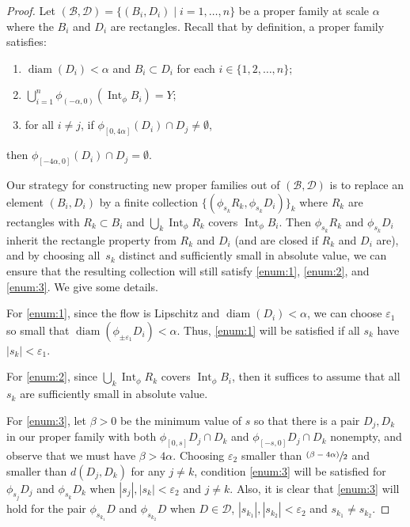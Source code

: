 \documentclass[11pt]{article}
\let\mathcal\mathscr
\let\epsilon\varepsilon
\let\sep\mid
\newcommand{\psfrac}[2]{\sfrac{(#1)}{#2}}
\theoremstyle{definition}
\numberwithin{equation}{section}
\DeclareMathOperator{\diam}{diam}
\DeclareMathOperator{\Int}{Int}
\newcommand\DDD{\mathcal D}
\newcommand\BBB{\mathcal B}
\begin{document}
\begin{proof}
Let $(\mathcal{B},\mathcal{D})= \{(B_i, D_i) \sep i = 1, \ldots, n \}$ be a proper family at scale $\alpha$ where the $B_i$ and $D_i$ are rectangles. Recall that by definition, a proper family satisfies:
\begin{enumerate}
\item\label{enum:1}
$\diam (D_i)< \alpha$ and $B_i \subset D_i$ for each $i \in \{1, 2, \ldots, n\}$;
\item\label{enum:2}
$\bigcup_{i=1}^n\phi_{(-\alpha, 0)} (\Int_\phi B_i)=Y$;
\item\label{enum:3}
for all $i\neq j$, if $\phi_{[0, 4\alpha]}(D_i) \cap D_j \neq \emptyset$, 
\end{enumerate}
then $\phi_{[-4\alpha, 0]}(D_i) \cap D_j = \emptyset$.

Our strategy for constructing new proper families out of $(\BBB, \DDD)$ is to replace an element $(B_i, D_i)$ by a finite collection $\{ (\phi_{s_k}R_k, \phi_{s_k}D_i) \}_k$ where $R_k$ are rectangles with $R_k \subset B_i$ and $\bigcup_k \Int_\phi R_k$ covers $\Int_\phi B_i$. Then $\phi_{s_k}R_k$ and $\phi_{s_k}D_i$ inherit the rectangle property from $R_k$ and $D_i$ (and are closed if $R_k$ and $D_i$ are), and by choosing all~$s_k$ distinct and sufficiently small in absolute value, we can ensure that the resulting collection will still satisfy \eqref{enum:1}, \eqref{enum:2}, and \eqref{enum:3}. We give some details.

For \eqref{enum:1}, since the flow is Lipschitz and $\diam(D_{i})<\alpha$, we can choose $\epsilon_1$ so small that $\diam(\phi_{\pm\epsilon_1}D_{i})<\alpha$. Thus, \eqref{enum:1} will be satisfied if all $s_k$ have $|s_k| < \epsilon_1$.

For \eqref{enum:2}, since $\bigcup_k \Int_\phi R_k$ covers $\Int_\phi B_i$, then it suffices to assume that all $s_k$ are sufficiently small in absolute value.

For \eqref{enum:3}, let $\beta>0$ be the minimum value of $s$ so that there is a pair $D_j, D_k$ in our proper family with both $\phi_{[0,s]} D_j \cap D_k$ and $\phi_{[-s,0]} D_j \cap D_k$ nonempty, and observe that we must have $\beta>4\alpha$. Choosing $\epsilon_2$ smaller than $\psfrac{\beta-4\alpha}{2}$ and smaller than $d(D_j, D_k)$ for any $j\neq k$, condition \eqref{enum:3} will be satisfied for $\phi_{s_j} D_j$ and $\phi_{s_k}D_k$ when $|s_j|, |s_k| < \epsilon_2$ and $j\neq k$. Also, it is clear that \eqref{enum:3} will hold for the pair $\phi_{s_{k_1}} D$ and $\phi_{s_{k_2}}D$ when $D \in \DDD$, $|s_{k_1}|, |s_{k_2}| < \epsilon_2$ and $s_{k_1} \neq s_{k_2}$.


\end{proof}
\end{document}
